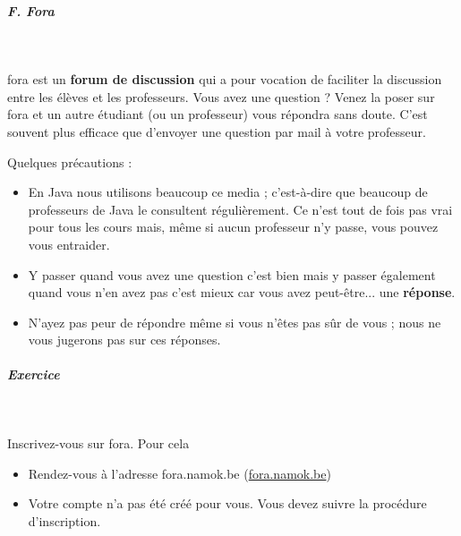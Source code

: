 \documentclass[11pt,a4paper]{article}
\begin{document}
            \par
        
			
		\subparagraph{F. Fora} 
		
					\textcolor{white}{.} \par
				
				fora est un 
				\textbf{forum de discussion}
				qui a pour vocation de faciliter la discussion
				entre les \'el\`eves et les professeurs.
				Vous avez une question ?
				Venez la poser sur fora
				et un autre \'etudiant (ou un professeur) 
				vous r\'epondra sans doute.
				C'est souvent plus efficace que d'envoyer une question
				par mail \`a votre professeur.
			
            \par
        
				Quelques pr\'ecautions :
				
					\begin{itemize}
				
			\item 
						En Java nous utilisons beaucoup
						ce media ; c'est-\`a-dire
						que beaucoup de professeurs de Java
						le consultent r\'eguli\`erement.
						Ce n'est tout de fois pas vrai
						pour tous les cours mais,
						m\^eme si aucun professeur n'y passe,
						vous pouvez vous entraider.
					
			\item 
						Y passer quand vous avez une question
						c'est bien mais y passer \'egalement
						quand vous n'en avez pas c'est mieux
						car vous avez peut-\^etre... une 
						\textbf{r\'eponse}.
					
			\item 
						N'ayez pas peur de r\'epondre 
						m\^eme si vous n'\^etes pas s\^ur de vous ;
						nous ne vous jugerons pas sur
						ces r\'eponses.
					
					\end{itemize}
				
            \par
        
			
		\subparagraph{Exercice} 
		
					\textcolor{white}{.} \par
				
				Inscrivez-vous sur fora.
				Pour cela
				
					\begin{itemize}
				
			\item 
						Rendez-vous \`a l'adresse
						fora.namok.be (\url{fora.namok.be})
			\item 
						Votre compte n'a pas \'et\'e cr\'e\'e pour vous.
						Vous devez suivre la proc\'edure
						d'inscription.
					
					\end{itemize}
				
\end{document}
